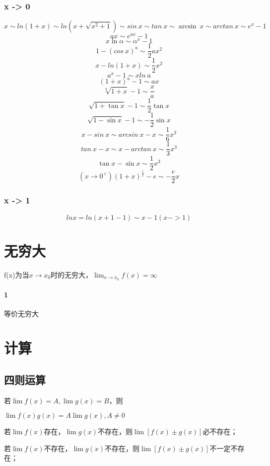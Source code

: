 \subsubsection{x -> 0}
\[x \sim ln(1 + x) \sim ln(x + \sqrt{x^2 + 1}) \sim sin\ x \sim tan\ x \sim \arcsin\ x \sim arctan\ x \sim e^x - 1\]
\[ax \sim e^{ax} - 1\]
\[x\ln\alpha \sim \alpha^x - 1\]
\[1 - (cos\ x)^a \sim \frac{1}{2}ax^2\]
\[x - ln(1 + x) \sim \frac{1}{2}x^2\]
\[a^x - 1 \sim xln\ a\]
\[(1 + x)^a - 1 \sim ax\]
\[\sqrt[a]{1 + x} - 1 \sim \frac{x}{a}\]
\[\sqrt{1 + \tan x} - 1 \sim \dfrac{1}{2}\tan x\]
\[\sqrt{1 - \sin x} - 1 \sim -\dfrac{1}{2}\sin x\]
\[x - sin\ x \sim arcsin\ x - x \sim \dfrac{1}{6}x^3\]
\[tan\ x - x \sim x - arctan\ x \sim \dfrac{1}{3}x^3\]
\[\tan x - \sin x \sim \dfrac{1}{2}x^3\]
\[(x \to 0^+)(1 + x)^{\frac{1}{x}} - e \sim -\frac{e}{2}x\]

\subsubsection{x -> 1}
\begin{displaymath}
lnx = ln(x + 1 - 1) \sim x - 1 (x->1)
\end{displaymath}

\section{无穷大}
f(x)为当\(x \to x_0\)时的无穷大，\(\displaystyle \lim_{x \to x_0}f(x) = \infty\)


\paragraph{1}
等价无穷大



\section{计算}

\subsection{四则运算}
若\(\lim f(x) = A, \lim g(x) = B\)，则

\(\lim f(x)g(x) = A\lim g(x), A \neq 0\)

若\(\lim f(x)\)存在，\(\lim g(x)\)不存在，则\(\lim[f(x) \pm g(x)]\)必不存在；

若\(\lim f(x)\)不存在，\(\lim g(x)\)不存在，则\(\lim[f(x) \pm g(x)]\)不一定不存在；


